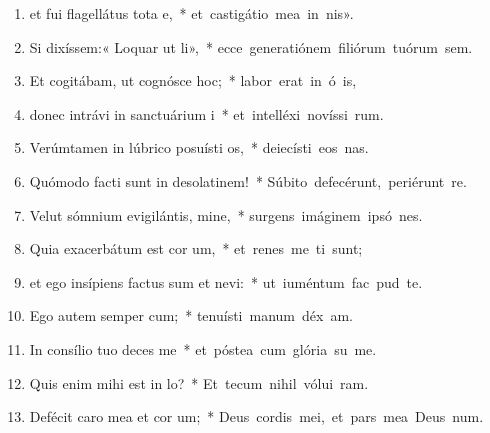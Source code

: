 \begin{flushleft}
\begin{enumerate}[leftmargin=*]
\item et fui flagellátus tota e,~* \mbox{et castigátio mea in nis».}

\item Si dixíssem:« Loquar ut li»,~* \mbox{ecce generatiónem filiórum tuórum sem.}

\item Et cogitábam, ut cognósce hoc;~* \mbox{labor erat in ó is,}

\item donec intrávi in sanctuárium i~* \mbox{et intelléxi novíssi rum.}

\item Verúmtamen in lúbrico posuísti os,~* \mbox{deiecísti eos  nas.}

\item Quómodo facti sunt in desolatinem!~* \mbox{Súbito defecérunt, periérunt  re.}

\item Velut sómnium evigilántis, mine,~* \mbox{surgens imáginem ipsó nes.}

\item Quia exacerbátum est cor um,~* \mbox{et renes me ti sunt;}

\item et ego insípiens factus sum et nevi:~* \mbox{ut iuméntum fac  pud te.}

\item Ego autem semper cum;~* \mbox{tenuísti manum déx am.}

\item In consílio tuo deces me~* \mbox{et póstea cum glória su me.}

\item Quis enim mihi est in lo?~* \mbox{Et tecum nihil vólui  ram.}

\item Defécit caro mea et cor um;~* \mbox{Deus cordis mei, et pars mea Deus  num.}


\end{enumerate}
\end{flushleft}
